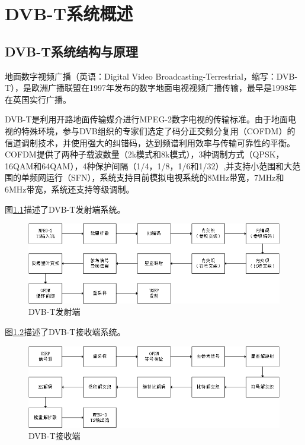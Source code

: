 \chapter{DVB-T系统概述}
	\section{DVB-T系统结构与原理}
	\label{sec:dvbt_summary}
		\par 地面数字视频广播（英语：Digital Video Broadcasting-Terrestrial，缩写：DVB-T），是欧洲广播联盟在1997年发布的数字地面电视视频广播传输，最早是1998年在英国实行广播。
		\par DVB-T是利用开路地面传输媒介进行MPEG-2数字电视的传输标准。由于地面电视的特殊环境，参与DVB组织的专家们选定了码分正交频分复用（COFDM）的信道调制技术，并使用强大的纠错码，达到频谱利用效率与传输可靠性的平衡。COFDM提供了两种子载波数量（2k模式和8k模式），3种调制方式（QPSK，16QAM和64QAM），4种保护间隔（1/4，1/8，1/6和1/32）,并支持小范围和大范围的单频网运行（SFN），系统支持目前模拟电视系统的8MHz带宽，7MHz和6MHz带宽，系统还支持等级调制。
		\par 图\ref{fig:dvbt_tx}描述了DVB-T发射端系统。
		\begin{figure}[htp]
			\centering
			\includegraphics[width=13cm]{figures/dvbt_tx.png}
			\caption{DVB-T发射端}
			\label{fig:dvbt_tx}
		\end{figure}
		\par 图\ref{fig:dvbt_rx}描述了DVB-T接收端系统。
		\begin{figure}[htp]
			\centering
			\includegraphics[width=13cm]{figures/dvbt_rx.png}
			\caption{DVB-T接收端}
			\label{fig:dvbt_rx}
		\end{figure}
